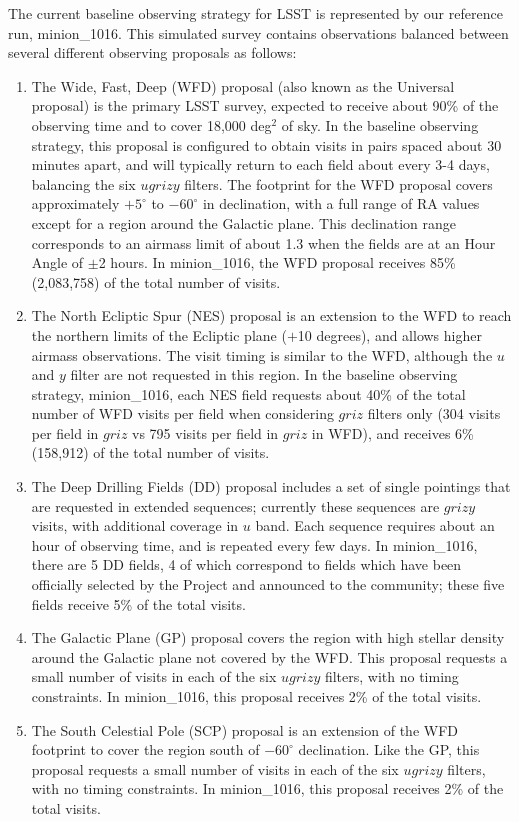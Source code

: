 The current baseline observing strategy for LSST is represented by our reference run, minion\_1016. This simulated survey
contains observations balanced between several different observing proposals as follows:
\begin{enumerate}
\item The Wide, Fast, Deep (WFD) proposal (also known as the Universal proposal) is the primary LSST survey, expected to receive about 90\% of the observing time and to cover 18,000 deg$^2$ of sky. In the baseline observing strategy, this proposal is configured to obtain visits in pairs spaced about 30 minutes apart, and will typically return to each field about every 3-4 days, balancing the six $ugrizy$ filters. The footprint for the WFD proposal covers approximately $+5^\circ$ to $-60^\circ$ in declination, with a full range of RA values except for a region around the Galactic plane. This declination range corresponds to an airmass limit of about 1.3 when the fields are at an Hour Angle of $\pm$2 hours. In minion\_1016, the WFD proposal receives 85\% (2,083,758) of the total number of visits.
\item The North Ecliptic Spur (NES) proposal is an extension to the WFD to reach the northern limits of the Ecliptic plane ($+$10 degrees), and allows higher airmass observations. The visit timing is similar to the WFD, although the $u$ and $y$ filter are not requested in this region. In the baseline observing strategy, minion\_1016, each NES field requests about 40\% of the total number of WFD visits per field when considering $griz$ filters only (304 visits per field in $griz$ vs 795 visits per field in $griz$ in WFD), and receives 6\% (158,912) of the total number of visits.
\item The Deep Drilling Fields (DD) proposal includes a set of single pointings that are requested in extended sequences; currently these sequences are $grizy$ visits, with additional coverage in $u$ band. Each sequence requires about an hour of observing time, and is repeated every few days. In minion\_1016, there are 5 DD fields, 4 of which correspond to fields which have been officially selected
by the Project and announced to the community; these five fields receive 5\% of the total visits.
\item The Galactic Plane (GP) proposal covers the region with high stellar density around the Galactic plane not covered by the WFD. This proposal requests a small number of visits in each of the six $ugrizy$ filters, with no timing constraints. In minion\_1016, this proposal receives 2\% of the total visits.
\item The South Celestial Pole (SCP) proposal is an extension of the WFD footprint to cover the region south of $-60^\circ$ declination. Like the GP, this proposal requests a small number of visits in each of the six $ugrizy$ filters, with no timing constraints. In minion\_1016, this proposal receives 2\% of the total visits.
\end{enumerate}

